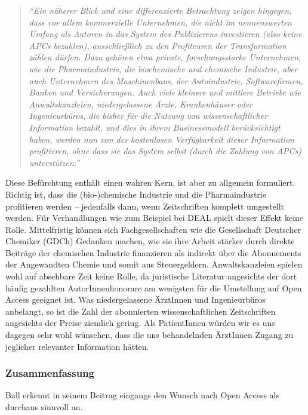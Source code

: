 \documentclass[a4paper,
fontsize=11pt,
oneside,
numbers=noperiodatend,
parskip=half-,
bibliography=totoc,
final
]{scrartcl}
\begin{document}
\begin{quote}
\emph{\enquote{Ein näherer Blick und eine differenzierte Betrachtung
zeigen hingegen, dass vor allem kommerzielle Unternehmen, die nicht im
nennenswerten Umfang als Autoren in das System des Publizierens
investieren (also keine APCs bezahlen), ausschließlich zu den
Profiteuren der Transformation zählen dürfen. Dazu gehören etwa private,
forschungsstarke Unternehmen, wie die Pharmaindustrie, die biochemische
und chemische Industrie, aber auch Unternehmen des Maschinenbaus, der
Autoindustrie, Softwarefirmen, Banken und Versicherungen. Auch viele
kleinere und mittlere Betriebe wie Anwaltskanzleien, niedergelassene
Ärzte, Krankenhäuser oder Ingenieurbüros, die bisher für die Nutzung von
wissenschaftlicher Information bezahlt, und dies in ihrem Businessmodell
berücksichtigt haben, werden nun von der kostenlosen Verfügbarkeit
dieser Information profitieren, ohne dass sie das System selbst (durch
die Zahlung von APCs) unterstützen.}}
\end{quote}

Diese Befürchtung enthält einen wahren Kern, ist aber zu allgemein
formuliert. Richtig ist, dass die (bio-)chemische Industrie und die
Pharmaindustrie profitieren werden -- jedenfalls dann, wenn
Zeitschriften komplett umgestellt werden. Für Verhandlungen wie zum
Beispiel bei DEAL spielt dieser Effekt keine Rolle. Mittelfristig können
sich Fachgesellschaften wie die Gesellschaft Deutscher Chemiker (GDCh)
Gedanken machen, wie sie ihre Arbeit stärker durch direkte Beiträge der
chemischen Industrie finanzieren als indirekt über die Abonnements der
Angewandten Chemie und somit aus Steuergeldern. Anwaltskanzleien spielen
wohl auf absehbare Zeit keine Rolle, da juristische Literatur angesichts
der dort häufig gezahlten AutorInnenhonorare am wenigsten für die
Umstellung auf Open Access geeignet ist. Was niedergelassene ÄrztInnen
und Ingenieurbüros anbelangt, so ist die Zahl der abonnierten
wissenschaftlichen Zeitschriften angesichts der Preise ziemlich gering.
Als PatientInnen würden wir es uns dagegen sehr wohl wünschen, dass die
uns behandelnden ÄrztInnen Zugang zu jeglicher relevanter Information
hätten.

\hypertarget{zusammenfassung}{%
\subsubsection{Zusammenfassung}\label{zusammenfassung}}

Ball erkennt in seinem Beitrag eingangs den Wunsch nach Open Access als
durchaus sinnvoll an.
\end{document}
